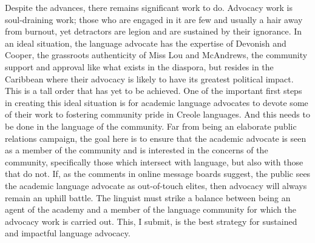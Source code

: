 \documentclass[output=paper,colorlinks,citecolor=brown]{langscibook}
\begin{document}
Despite the advances, there remains significant work to do. Advocacy work is soul-draining work; those who are engaged in it are few and usually a hair away from burnout, yet detractors are legion and are sustained by their ignorance. In an ideal situation, the language advocate has the expertise of Devonish and Cooper, the grassroots authenticity of Miss Lou and McAndrews, the community support and approval like what exists in the diaspora, but resides in the Caribbean where their advocacy is likely to have its greatest political impact. This is a tall order that has yet to be achieved. One of the important first steps in creating this ideal situation is for academic language advocates to devote some of their work to fostering community pride in Creole languages. And this needs to be done in the language of the community. Far from being an elaborate public relations campaign, the goal here is to ensure that the academic advocate is seen as a member of the community and is interested in the concerns of the community, specifically those which intersect with language, but also with those that do not. If, as the comments in online message boards suggest, the public sees the academic language advocate as out-of-touch elites, then advocacy will always remain an uphill battle. The linguist must strike a balance between being an agent of the academy and a member of the language community for which the advocacy work is carried out. This, I submit, is the best strategy for sustained and impactful language advocacy. 

{\sloppy\printbibliography[heading=subbibliography,notkeyword=this]}
\end{document}
